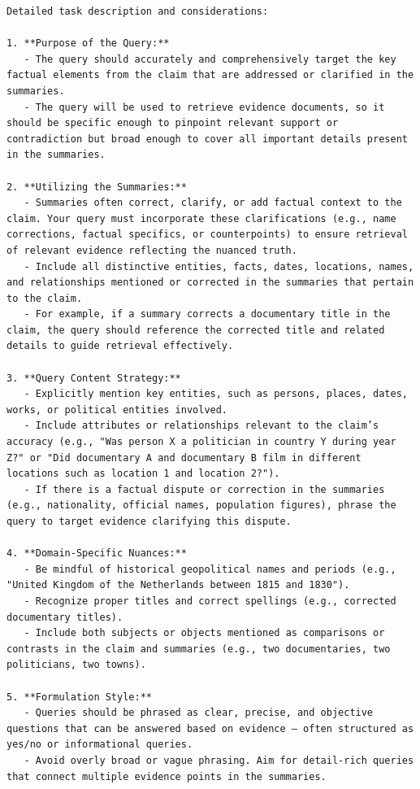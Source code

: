 \begin{instructbox}
\begin{lstlisting}[breakindent=0pt, breaklines=true, breakatwhitespace=true, frame=single, backgroundcolor=\color{blue!10}]
Detailed task description and considerations:

1. **Purpose of the Query:**
   - The query should accurately and comprehensively target the key factual elements from the claim that are addressed or clarified in the summaries.
   - The query will be used to retrieve evidence documents, so it should be specific enough to pinpoint relevant support or contradiction but broad enough to cover all important details present in the summaries.
   
2. **Utilizing the Summaries:**
   - Summaries often correct, clarify, or add factual context to the claim. Your query must incorporate these clarifications (e.g., name corrections, factual specifics, or counterpoints) to ensure retrieval of relevant evidence reflecting the nuanced truth.
   - Include all distinctive entities, facts, dates, locations, names, and relationships mentioned or corrected in the summaries that pertain to the claim.  
   - For example, if a summary corrects a documentary title in the claim, the query should reference the corrected title and related details to guide retrieval effectively.

3. **Query Content Strategy:**
   - Explicitly mention key entities, such as persons, places, dates, works, or political entities involved.
   - Include attributes or relationships relevant to the claim’s accuracy (e.g., "Was person X a politician in country Y during year Z?" or "Did documentary A and documentary B film in different locations such as location 1 and location 2?").
   - If there is a factual dispute or correction in the summaries (e.g., nationality, official names, population figures), phrase the query to target evidence clarifying this dispute.

4. **Domain-Specific Nuances:**
   - Be mindful of historical geopolitical names and periods (e.g., "United Kingdom of the Netherlands between 1815 and 1830").
   - Recognize proper titles and correct spellings (e.g., corrected documentary titles).
   - Include both subjects or objects mentioned as comparisons or contrasts in the claim and summaries (e.g., two documentaries, two politicians, two towns).
   
5. **Formulation Style:**
   - Queries should be phrased as clear, precise, and objective questions that can be answered based on evidence — often structured as yes/no or informational queries.
   - Avoid overly broad or vague phrasing. Aim for detail-rich queries that connect multiple evidence points in the summaries.


\end{lstlisting}
\end{instructbox}
